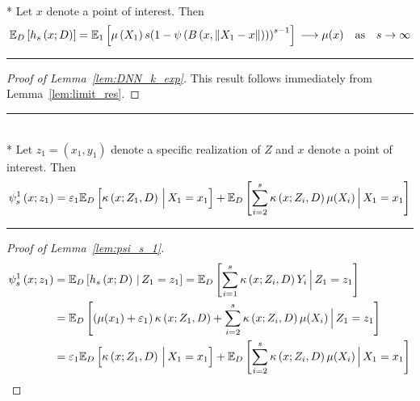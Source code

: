 \begin{lem}\label{lem:DNN_k_exp}\mbox{}\\*
	Let $x$ denote a point of interest.
	Then
	\begin{equation}
		\mathbb{E}_D\left[h_s\left(x; D\right)\right]
		= \mathbb{E}_{1}\left[\mu\left(X_1\right) s{\left(1 - \psi\left(B\left(x, \|X_1 - x\|\right)\right)\right)}^{s-1}\right]\\
		\longrightarrow \mu(x) \quad \text{as} \quad s \rightarrow \infty
	\end{equation}
\end{lem}
\hrule
\begin{proof}[Proof of Lemma~\ref{lem:DNN_k_exp}]
	This result follows immediately from Lemma~\ref{lem:limit_res}.
\end{proof}

\hrule

\begin{lem}\label{lem:psi_s_1}\mbox{}\\*
	Let $z_1 = (x_1, y_1)$ denote a specific realization of $Z$ and $x$ denote a point of interest.
	Then
	\begin{equation}
		\psi_{s}^{1}\left(x; z_1\right)
		= \varepsilon_1 \mathbb{E}_D\left[\kappa\left(x; Z_1, D\right)\, \Big| \, X_1 = x_1 \right]
		+ \mathbb{E}_{D}\left[\sum_{i = 2}^{s} \kappa\left(x; Z_{i}, D\right) \mu(X_{i})\, \Big| \, X_1 = x_1 \right]
	\end{equation}
\end{lem}
\hrule
\begin{proof}[Proof of Lemma~\ref{lem:psi_s_1}]
	\begin{equation}
		\begin{aligned}
			\psi_{s}^{1}\left(x; z_1\right)
			 & = \mathbb{E}_{D}\left[h_{s}\left(x; D\right) \, | \, Z_1 = z_1 \right]
			= \mathbb{E}_{D}\left[\sum_{i = 1}^{s} \kappa\left(x; Z_{i}, D\right) Y_{i} \, \Big| \, Z_1 = z_1 \right] \\
			 & = \mathbb{E}_{D}\left[\left(\mu(x_1) + \varepsilon_1\right)\kappa\left(x; Z_1, D\right)
			+ \sum_{i = 2}^{s} \kappa\left(x; Z_{i}, D\right) \mu(X_{i})\, \Big| \, Z_1 = z_1 \right]         \\
			 & = \varepsilon_1 \mathbb{E}_D\left[\kappa\left(x; Z_1, D\right)\, \Big| \, X_1 = x_1 \right]
			+ \mathbb{E}_{D}\left[\sum_{i = 2}^{s} \kappa\left(x; Z_{i}, D\right) \mu(X_{i})\, \Big| \, X_1 = x_1 \right]
		\end{aligned}
	\end{equation}
\end{proof}
